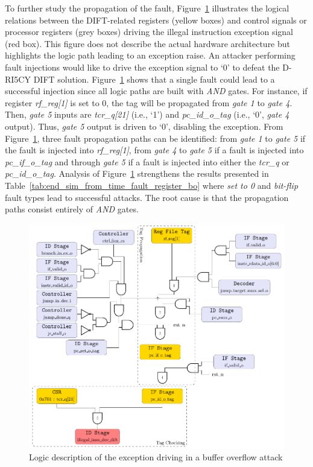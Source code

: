 To further study the propagation of the fault, Figure~\ref{fig:buffer_overflow_tag_propagation} illustrates the logical relations between the DIFT-related registers (yellow boxes) and control signals or processor registers (grey boxes) driving the illegal instruction exception signal (red box). This figure does not describe the actual hardware architecture but highlights the logic path leading to an exception raise. An attacker performing fault injections would like to drive the exception signal to `0' to defeat the D-RI5CY DIFT solution. Figure~\ref{fig:buffer_overflow_tag_propagation} shows that a single fault could lead to a successful injection since all logic paths are built with \textit{AND} gates. For instance, if register \textit{rf\_reg[1]} is set to 0, the tag will be propagated from \textit{gate 1} to \textit{gate 4}. Then, \textit{gate 5} inputs are \textit{tcr\_q[21]} (i.e., `1') and \textit{pc\_id\_o\_tag} (i.e., `0',  \textit{gate 4} output). Thus, \textit{gate 5} output is driven to `0', disabling the exception. 
From Figure~\ref{fig:buffer_overflow_tag_propagation}, three fault propagation paths can be identified: from \textit{gate 1} to \textit{gate 5} if the fault is injected into \textit{rf\_reg[1]}, from \textit{gate 4} to \textit{gate 5} if a fault is injected into \textit{pc\_if\_o\_tag} and through \textit{gate 5} if a fault is injected into either the \textit{tcr\_q} or \textit{pc\_id\_o\_tag}.
Analysis of Figure~\ref{fig:buffer_overflow_tag_propagation} strengthens the results presented in Table~\ref{tab:end_sim_from_time_fault_register_bo} where \textit{set to 0} and \textit{bit-flip} fault types lead to successful attacks. The root cause is that the propagation paths consist entirely of \textit{AND} gates. 

\begin{figure}[ht]
    \centering
    \includegraphics[width=\textwidth]{c3_vulnerabilities_assessment/img/buffer_overflow/arborescence_bufferOverflow.pdf}
    \caption{Logic description of the exception driving in a buffer overflow attack}
    \label{fig:buffer_overflow_tag_propagation}
\end{figure}

